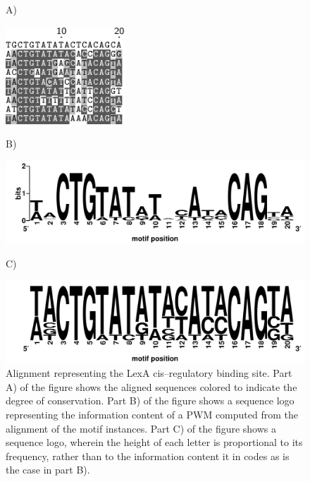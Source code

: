             \begin{figure}[ptb]
        A)
            \begin{center}
            \includegraphics[width=0.4\textwidth]{Body/Images-chap3/lexa.pdf}
            \end{center}
        \bigskip
        B)
            \begin{center}
            \includegraphics[width=\textwidth]{Body/Images-chap3/lexa1.pdf}
            \end{center}
        \bigskip
            C)
            \begin{center}
        \includegraphics[width=\textwidth]{Body/Images-chap3/lexa2.pdf}
            \end{center}
            \caption[Alignment representing the LexA cis--regulatory binding site]{
                Alignment representing the LexA cis--regulatory binding site.
                Part A) of the figure shows the aligned sequences
                colored to indicate the degree of conservation.
                Part B) of the figure shows a sequence logo
                representing the information content of a PWM
                computed from the alignment of the motif instances.
                Part C) of the figure shows a sequence logo, wherein
                the height of each letter is proportional to its
                frequency, rather than to the information content it
                in codes as is the case in part B).
            }
            \label{fig:lexaLogo}
            \end{figure}


